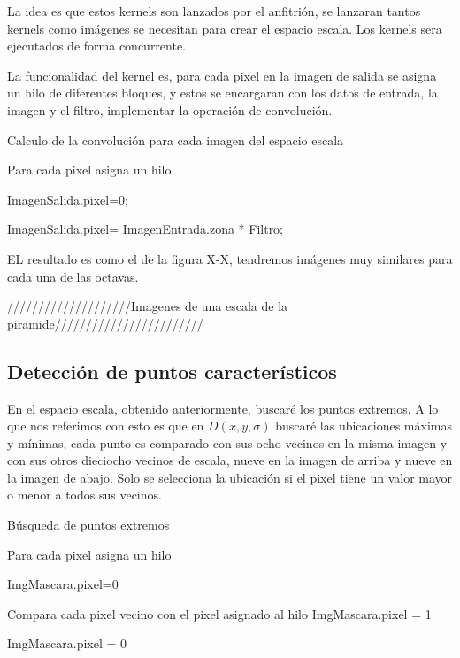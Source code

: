 La idea es que estos kernels son lanzados por el anfitrión, se lanzaran tantos kernels como imágenes se necesitan para crear el espacio escala. Los kernels sera ejecutados de forma concurrente. 

La funcionalidad del kernel es, para cada pixel en la imagen de salida se asigna un hilo de diferentes bloques, y estos se encargaran con los datos de entrada, la imagen y el filtro, implementar la operación de convolución.\\

\begin{algorithm}[H]
\caption{Calculo de la convolución para cada imagen del espacio escala}
 Para cada pixel asigna un hilo\;
 
 {
	{
		ImagenSalida.pixel=0;
	}{
		
		ImagenSalida.pixel= ImagenEntrada.zona * Filtro; 
		\\
		}
 }
	

\end{algorithm}



EL resultado es como el de la figura X-X, tendremos imágenes muy similares para cada una de las octavas.

////////////////////Imagenes de una escala de la piramide////////////////////////
 
\subsection{Detección de puntos característicos}
En el espacio escala, obtenido anteriormente, buscaré los puntos extremos. A lo que nos referimos con esto es que en $D(x,y,\sigma)$ buscaré las ubicaciones máximas y mínimas, cada punto es comparado con sus ocho vecinos en la misma imagen y con sus otros dieciocho vecinos de escala, nueve en la imagen de arriba y nueve en la imagen de abajo. Solo se selecciona la ubicación si el pixel tiene un valor mayor o menor a todos sus vecinos.\\


\begin{algorithm}[H]
\caption{Búsqueda de puntos extremos}
 Para cada pixel asigna un hilo\;
 
 {
	{
		ImgMascara.pixel=0\;
	}{
		{
			Compara cada pixel vecino con el pixel asignado al hilo\;
			{
				ImgMascara.pixel = 1\;			
			}{
				ImgMascara.pixel = 0\;
			
			}
		
		}
		
	}
 }
	
\end{algorithm}


